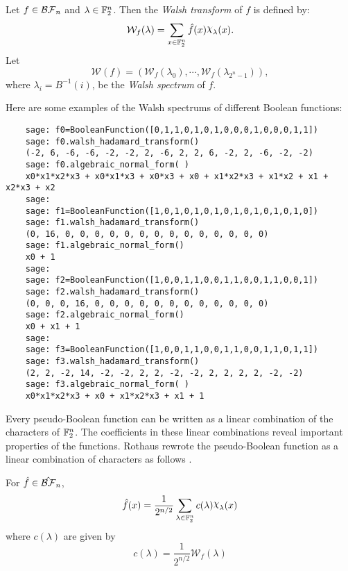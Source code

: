 \begin{definition}\label{def:walsh}
  Let $f\in\mathcal{BF}_n$ and $\lambda\in\mathbb{F}_2^n$. Then the {\em Walsh transform}
  of $f$ is defined by:
  \begin{equation}\label{eqn:walsh}
    \mathcal{W}_f(\lambda)=\sum_{x\in\gftwo^n}\hat{f}(x)\Chi_\lambda(x).
  \end{equation}
  Let
  \[
    \mathcal{W}(f)=(\mathcal{W}_f(\lambda_0),\cdots,\mathcal{W}_f(\lambda_{2^n-1})),
  \]
  where $\lambda_i=B^{-1}(i)$, be the {\it Walsh spectrum} of $f$.
\end{definition}

\begin{example}
\par Here are some examples of the Walsh spectrums of different Boolean
functions:
  \begin{lstlisting}
    sage: f0=BooleanFunction([0,1,1,0,1,0,1,0,0,0,1,0,0,0,1,1])
    sage: f0.walsh_hadamard_transform()
    (-2, 6, -6, -6, -2, -2, 2, -6, 2, 2, 6, -2, 2, -6, -2, -2)
    sage: f0.algebraic_normal_form( )
    x0*x1*x2*x3 + x0*x1*x3 + x0*x3 + x0 + x1*x2*x3 + x1*x2 + x1 + x2*x3 + x2
    sage:
    sage: f1=BooleanFunction([1,0,1,0,1,0,1,0,1,0,1,0,1,0,1,0])
    sage: f1.walsh_hadamard_transform()
    (0, 16, 0, 0, 0, 0, 0, 0, 0, 0, 0, 0, 0, 0, 0, 0)
    sage: f1.algebraic_normal_form()
    x0 + 1
    sage:
    sage: f2=BooleanFunction([1,0,0,1,1,0,0,1,1,0,0,1,1,0,0,1])
    sage: f2.walsh_hadamard_transform()
    (0, 0, 0, 16, 0, 0, 0, 0, 0, 0, 0, 0, 0, 0, 0, 0)
    sage: f2.algebraic_normal_form()
    x0 + x1 + 1
    sage:
    sage: f3=BooleanFunction([1,0,0,1,1,0,0,1,1,0,0,1,1,0,1,1])
    sage: f3.walsh_hadamard_transform()
    (2, 2, -2, 14, -2, -2, 2, 2, -2, -2, 2, 2, 2, 2, -2, -2)
    sage: f3.algebraic_normal_form( )
    x0*x1*x2*x3 + x0 + x1*x2*x3 + x1 + 1
  \end{lstlisting}
\end{example}

\par 
\par Every pseudo-Boolean function can be written as a linear combination of
the characters of $\mathbb{F}_2^n$. The coefficients in these linear combinations
reveal important properties of the functions. Rothaus rewrote the
pseudo-Boolean function as a linear combination of characters
as follows \cite{art:r76}. 

\begin{lemma}
  For $\hat{f}\in\hat{\mathcal{BF}}_n$,
\begin{equation}\label{eqn:rewrite-pseudo}
  \hat{f}(x)
    =\frac{1}{2^{n/2}}
      \sum_{\lambda\in\gftwo^n}c(\lambda)\Chi_\lambda(x)
\end{equation}
  where $c(\lambda)$ are given by
  \begin{equation}\label{eqn:clambda}
    c(\lambda)=\frac{1}{2^{n/2}}\mathcal{W}_f(\lambda)
  \end{equation}
\end{lemma}


